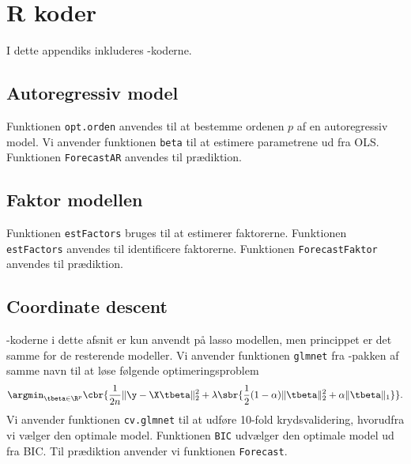 \chapter{R koder} \label{app:r_koder}
I dette appendiks inkluderes \Rlang -koderne. 

\section{Autoregressiv model} \label{sec:auto}
Funktionen \texttt{opt.orden} anvendes til at bestemme ordenen $p$ af en autoregressiv model.  
%
Vi anvender funktionen \texttt{beta} til at estimere parametrene ud fra OLS. 
%
Funktionen \texttt{ForecastAR} anvendes til prædiktion.

\section{Faktor modellen} \label{sec:faktor}
Funktionen \texttt{estFactors} bruges til at estimerer faktorerne.
%
Funktionen \texttt{estFactors} anvendes til identificere faktorerne. 
%
%
Funktionen \texttt{ForecastFaktor} anvendes til prædiktion.

\section{Coordinate descent} \label{sec:apprkodercoordinate}
\Rlang-koderne i dette afsnit er kun anvendt på lasso modellen, men princippet er det samme for de resterende modeller.  
Vi anvender funktionen \texttt{glmnet} fra \Rlang-pakken  af samme navn til at løse følgende optimeringsproblem 
\begin{align*}
\argmin_{\tbeta \in \R^p} \cbr{ \frac{1}{2n} \Vert \y - \X \tbeta \Vert_2^2 + \lambda \sbr{\frac{1}{2}(1- \alpha) \Vert \tbeta \Vert_2^2 + \alpha \Vert \tbeta \Vert_1}}.
\end{align*}
%
Vi anvender funktionen \texttt{cv.glmnet} til at udføre 10-fold krydsvalidering, hvorudfra vi vælger den optimale model. 
%
Funktionen \texttt{BIC} udvælger den optimale model ud fra BIC. 
%
Til prædiktion anvender vi funktionen \texttt{Forecast}.


